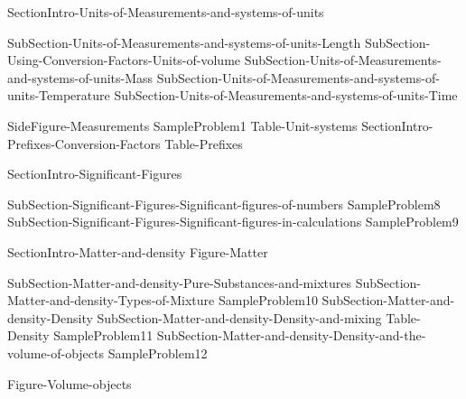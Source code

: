 \documentclass[main.tex]{subfiles}
\begin{document}
{SectionIntro-Units-of-Measurements-and-systems-of-units}
\sloppy\begin{description}
{SubSection-Units-of-Measurements-and-systems-of-units-Length}
{SubSection-Using-Conversion-Factors-Units-of-volume}
{SubSection-Units-of-Measurements-and-systems-of-units-Mass}
{SubSection-Units-of-Measurements-and-systems-of-units-Temperature}
{SubSection-Units-of-Measurements-and-systems-of-units-Time}
\end{description}
{SideFigure-Measurements}
{SampleProblem1}
{Table-Unit-systems}
{SectionIntro-Prefixes-Conversion-Factors}
{Table-Prefixes}
\sloppy{}
{SectionIntro-Significant-Figures}
\sloppy\begin{description}
{SubSection-Significant-Figures-Significant-figures-of-numbers}
{SampleProblem8}
{SubSection-Significant-Figures-Significant-figures-in-calculations}
{SampleProblem9}
\end{description}
\newpage
{SectionIntro-Matter-and-density}
{Figure-Matter}		
\begin{description}
{SubSection-Matter-and-density-Pure-Substances-and-mixtures}
{SubSection-Matter-and-density-Types-of-Mixture}
{SampleProblem10}
{SubSection-Matter-and-density-Density}
{SubSection-Matter-and-density-Density-and-mixing}
{Table-Density} 
{SampleProblem11}
{SubSection-Matter-and-density-Density-and-the-volume-of-objects}
{SampleProblem12}

{Figure-Volume-objects}



\end{description}
\end{document}
